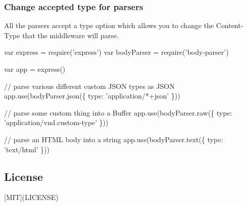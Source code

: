 \subsubsection*{Change accepted type for parsers}

All the parsers accept a {\ttfamily type} option which allows you to change the {\ttfamily Content-\/\+Type} that the middleware will parse.


\begin{DoxyCode}
var express = require('express')
var bodyParser = require('body-parser')

var app = express()

// parse various different custom JSON types as JSON
app.use(bodyParser.json(\{ type: 'application/*+json' \}))

// parse some custom thing into a Buffer
app.use(bodyParser.raw(\{ type: 'application/vnd.custom-type' \}))

// parse an HTML body into a string
app.use(bodyParser.text(\{ type: 'text/html' \}))
\end{DoxyCode}


\subsection*{License}

\mbox{[}M\+IT\mbox{]}(L\+I\+C\+E\+N\+SE) 